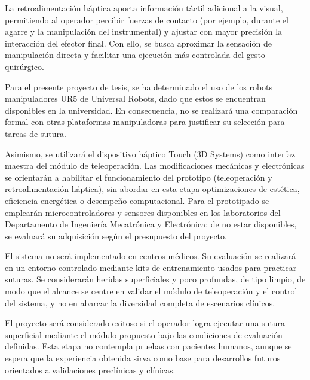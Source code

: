 La retroalimentación háptica aporta información táctil adicional a la visual,
permitiendo al operador percibir fuerzas de contacto (por ejemplo, durante el
agarre y la manipulación del instrumental) y ajustar con mayor precisión la
interacción del efector final. Con ello, se busca aproximar la sensación de
manipulación directa y facilitar una ejecución más controlada del gesto
quirúrgico.


Para el presente proyecto de tesis, se ha determinado el uso de los robots
manipuladores UR5 de Universal Robots, dado que estos se encuentran disponibles
en la universidad. En consecuencia, no se realizará una comparación formal con
otras plataformas manipuladoras para justificar su selección para tareas de
sutura.

Asimismo, se utilizará el dispositivo háptico Touch (3D Systems) como interfaz
maestra del módulo de teleoperación. Las modificaciones mecánicas y
electrónicas se orientarán a habilitar el funcionamiento del prototipo
(teleoperación y retroalimentación háptica), sin abordar en esta etapa
optimizaciones de estética, eficiencia energética o desempeño computacional.
Para el prototipado se emplearán microcontroladores y sensores disponibles en
los laboratorios del Departamento de Ingeniería Mecatrónica y Electrónica; de
no estar disponibles, se evaluará su adquisición según el presupuesto del
proyecto.

El sistema no será implementado en centros médicos. Su evaluación se realizará
en un entorno controlado mediante kits de entrenamiento usados para practicar
suturas. Se considerarán heridas superficiales y poco profundas, de tipo
limpio, de modo que el alcance se centre en validar el módulo de teleoperación
y el control del sistema, y no en abarcar la diversidad completa de escenarios
clínicos.

El proyecto será considerado exitoso si el operador logra ejecutar una sutura
superficial mediante el módulo propuesto bajo las condiciones de evaluación
definidas. Esta etapa no contempla pruebas con pacientes humanos, aunque se
espera que la experiencia obtenida sirva como base para desarrollos futuros
orientados a validaciones preclínicas y clínicas.

%